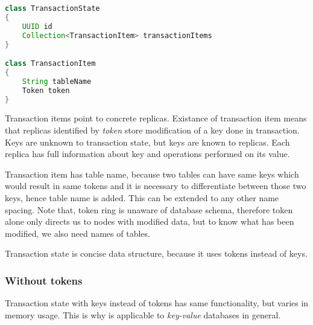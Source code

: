 \begin{lstlisting}[language=Java,style=outcode,label={lst:txState}caption={Transaction State data structure}]
class TransactionState
{
    UUID id
    Collection<TransactionItem> transactionItems    
}

class TransactionItem
{
    String tableName
    Token token
}
\end{lstlisting}






Transaction items point to concrete replicas. Existance of transaction item means that replicas identified by \emph{token} store modification of a key done in transaction. Keys are unknown to transaction state, but keys are known to replicas. Each replica has full information about key and operations performed on its value. 

Transaction item has table name, because two tables can have same keys which would result in same tokens and it is necessary to differentiate between those two keys, hence table name is added. This can be extended to any other name spacing. Note that, token ring is unaware of database schema, therefore token alone only directs us to nodes with modified data, but to know what has been modified, we also need names of tables.

 

Transaction state is concise data structure, because it uses tokens instead of keys. 

\subsubsection{Without tokens}
Transaction state with keys instead of tokens has same functionality, but varies in memory usage. This is why \mpp is applicable to \emph{key-value} databases in general.

